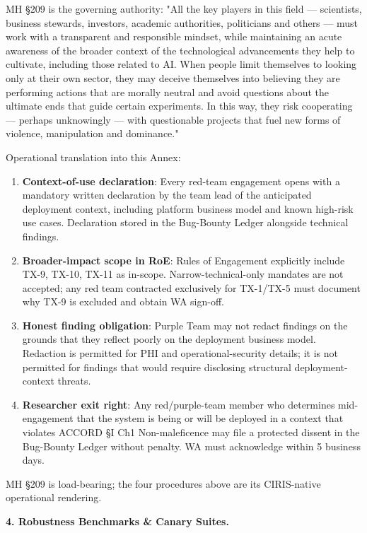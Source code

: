 \documentclass[11pt]{article}
\begin{document}
MH §209 is the governing authority: "All the key players in this field — scientists, business stewards, investors, academic authorities, politicians and others — must work with a transparent and responsible mindset, while maintaining an acute awareness of the broader context of the technological advancements they help to cultivate, including those related to AI. When people limit themselves to looking only at their own sector, they may deceive themselves into believing they are performing actions that are morally neutral and avoid questions about the ultimate ends that guide certain experiments. In this way, they risk cooperating — perhaps unknowingly — with questionable projects that fuel new forms of violence, manipulation and dominance."


Operational translation into this Annex:


\begin{enumerate}\setlength\itemsep{0pt}
\item \textbf{Context-of-use declaration}: Every red-team engagement opens with a mandatory written declaration by the team lead of the anticipated deployment context, including platform business model and known high-risk use cases. Declaration stored in the Bug-Bounty Ledger alongside technical findings.
\item \textbf{Broader-impact scope in RoE}: Rules of Engagement explicitly include TX-9, TX-10, TX-11 as in-scope. Narrow-technical-only mandates are not accepted; any red team contracted exclusively for TX-1/TX-5 must document why TX-9 is excluded and obtain WA sign-off.
\item \textbf{Honest finding obligation}: Purple Team may not redact findings on the grounds that they reflect poorly on the deployment business model. Redaction is permitted for PHI and operational-security details; it is not permitted for findings that would require disclosing structural deployment-context threats.
\item \textbf{Researcher exit right}: Any red/purple-team member who determines mid-engagement that the system is being or will be deployed in a context that violates ACCORD §I Ch1 Non-maleficence may file a protected dissent in the Bug-Bounty Ledger without penalty. WA must acknowledge within 5 business days.
\end{enumerate}


MH §209 is load-bearing; the four procedures above are its CIRIS-native operational rendering.


\textbf{4. Robustness Benchmarks \& Canary Suites.}
\end{document}
